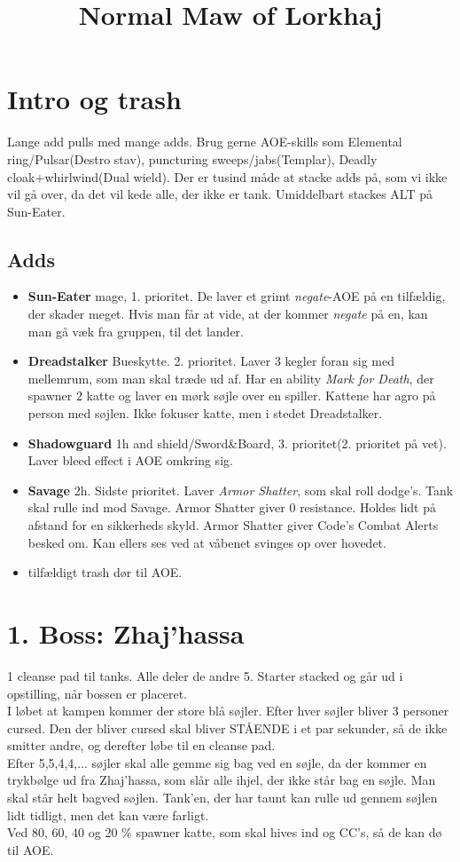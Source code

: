 \documentclass[12pt,a4paper]{article}
\begin{document}
\title{Normal Maw of Lorkhaj}
\author{}
\date{}
\maketitle
\section*{Intro og trash}
Lange add pulls med mange adds. Brug gerne AOE-skills som Elemental ring/Pulsar(Destro
stav), puncturing sweeps/jabs(Templar), Deadly cloak+whirlwind(Dual wield).
Der er tusind måde at stacke adds på, som vi ikke vil gå over, da det vil kede
alle, der ikke er tank. Umiddelbart stackes ALT på Sun-Eater.
\subsection*{Adds}
\begin{itemize}
\item \textbf{Sun-Eater} mage, 1. prioritet. De laver et grimt
  \emph{negate}-AOE på en tilfældig, der skader meget. Hvis man får at vide, at
  der kommer \emph{negate} på en, kan man gå væk fra gruppen, til det lander.
\item \textbf{Dreadstalker} Bueskytte. 2. prioritet. Laver 3 kegler
  foran sig med mellemrum, som man skal træde ud af. Har en ability
  \emph{Mark for Death}, der spawner 2 katte og laver en mørk søjle over en
  spiller. Kattene har agro på person med søjlen. Ikke fokuser katte, men i
  stedet Dreadstalker.
\item \textbf{Shadowguard} 1h and shield/Sword\&Board, 3.
  prioritet(2. prioritet på vet). Laver bleed effect i AOE omkring sig.
\item \textbf{Savage} 2h. Sidste prioritet. Laver \emph{Armor
  Shatter}, som skal roll dodge's. Tank skal rulle ind mod Savage. Armor
  Shatter giver 0 resistance. Holdes lidt
  på afstand for en sikkerheds skyld. Armor Shatter giver Code's Combat Alerts
  besked om. Kan ellers ses ved at våbenet svinges op over hovedet.
\item tilfældigt trash dør til AOE. 
\end{itemize}
\section*{1. Boss: Zhaj'hassa}
1 cleanse pad til tanks. Alle deler de andre 5. 
Starter stacked og går ud i opstilling, når bossen er placeret.\\ 
I løbet at kampen kommer der store blå søjler. Efter hver søjler bliver 3
personer cursed. Den der bliver cursed skal bliver STÅENDE i et par sekunder,
så de ikke smitter andre, og derefter løbe til en cleanse pad. \\
Efter 5,5,4,4,... søjler skal alle gemme sig bag ved en søjle, da der kommer en
trykbølge ud fra Zhaj'hassa, som slår alle ihjel, der ikke står bag en søjle.
Man skal står helt bagved søjlen. Tank'en, der har taunt kan rulle ud gennem
søjlen lidt tidligt, men det kan være farligt. \\
Ved 80, 60, 40 og 20 \% spawner katte, som skal hives ind og CC's, så de kan dø
til AOE.
\end{document}
